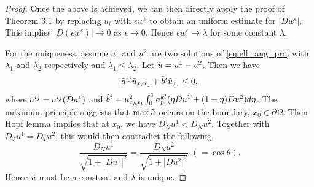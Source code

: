 \documentclass[10pt,a4paper]{amsart}
\begin{document}
\begin{proof}
Once the above is achieved, we can then directly apply the proof of Theorem 3.1 by replacing $u_t$ with $\epsilon w^{\epsilon}$ to obtain an uniform estimate for $|Dw^{\epsilon}|$.
This implies $| D (\epsilon w^{\epsilon})| \rightarrow 0$ as $\epsilon \rightarrow 0$. Hence $\epsilon w^{\epsilon} \rightarrow \lambda$ for some constant $\lambda$.

For the uniqueness, assume $u^1$ and $u^2$ are two solutions of \eqref{eq:ell_ang_pro} with $\lambda_1$ and $\lambda_2$ respectively and $\lambda_1 \leq \lambda_2$. Let $\Tilde{u}=u^1 - u^2$. Then we have
\begin{equation*}
    \Tilde{a}^{ij} \Tilde{u}_{x_i x_j} + \Tilde{b}^{i} \Tilde{u}_{x_i} \leq 0,
\end{equation*}
where $\Tilde{a}^{ij} = a^{ij} (Du^1)$ and $\Tilde{b}^{i} = u^2_{x_k x_l} \int^1_0 a^{kl}_{p_i} (\eta Du^1 + (1-\eta) Du^2 ) d\eta $. The maximum principle suggests that 
$\max \Tilde{u}$ occurs on the boundary, $x_0 \in \partial \Omega$. Then Hopf lemma implies that at $x_0$, we have $D_N u^1 < D_N u^2$. Together with $D_T u^1 = D_T u^2$, this would then contradict the following,  
\begin{equation*}
    \frac{D_N u^1}{\sqrt{1+|D u^1|^2}} =  \frac{D_N u^2}{\sqrt{1+|D u^2|^2}}
    \,\,(=\cos\theta).
\end{equation*}
Hence $\Tilde{u}$ must be a constant and $\lambda$ is unique.
\end{proof} 
\end{document}
